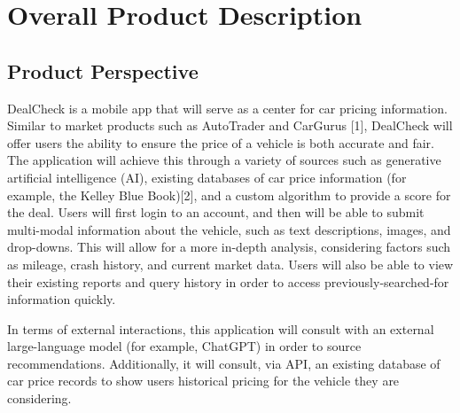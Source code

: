 \documentclass[]{article}
\begin{document}

\section{Overall Product Description}
\label{sec:overall_description}

\subsection{Product Perspective}
\label{sub:product_perspective}
DealCheck is a mobile app that will serve as a center for car pricing information. Similar to market products such as AutoTrader and CarGurus [1], DealCheck 
will offer users the ability to ensure the price of a vehicle is both accurate and fair. The application will achieve this through a variety of sources 
such as generative artificial intelligence (AI), existing databases of car price information (for example, the Kelley Blue Book)[2], and a custom algorithm 
to provide a score for the deal. Users will first login to an account, and then will be able to submit multi-modal information about the vehicle, such as 
text descriptions, images, and drop-downs. This will allow for a more in-depth analysis, considering factors such as mileage, crash history, and current 
market data. Users will also be able to view their existing reports and query history in order to access previously-searched-for information quickly. \newline

\noindent In terms of external interactions, this application will consult with an external large-language model (for example, ChatGPT) in order to source recommendations. 
Additionally, it will consult, via API, an existing database of car price records to show users historical pricing for the vehicle they are considering.
\end{document}
